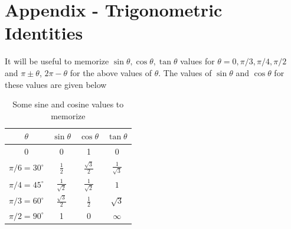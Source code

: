 %

%


\newpage
\section{Appendix - Trigonometric Identities}
It will be useful to memorize $\sin \theta,\cos \theta,\tan \theta$ values for $\theta = 0,\pi/3,\pi/4,\pi/2$
and $\pi \pm \theta$, $2\pi - \theta$ for the above values of $\theta$. The values of $\sin \theta$ and $\cos \theta$ for these values are given below

\begin{table}[ht]
\caption{Some sine and cosine values to memorize}
\centering
\vspace*{0.1in}
\begin{tabular}{|c|c|c|c|}
  \hline
  $\theta$ & $\sin \theta $ & $\cos \theta $ & $\tan \theta$\\
  \hline
  0 & 0 & 1 & 0 \\
  \hline
  $\pi/6 = 30^{\circ}$ & $\frac{1}{2}$ & $\frac{\sqrt{3}}{2}$ & $\frac{1}{\sqrt{3}}$\\
  \hline
  $\pi/4 = 45^{\circ}$ & $\frac{1}{\sqrt{2}}$ & $\frac{1}{\sqrt{2}}$ & $1$\\
  \hline
  $\pi/3 = 60^{\circ}$ & $\frac{\sqrt{3}}{2}$ &  $\frac{1}{2}$ & $\sqrt{3}$\\
  \hline
  $\pi/2 = 90^{\circ}$ & 1 & 0 & $\infty$\\
  \hline
\end{tabular}
\end{table}

